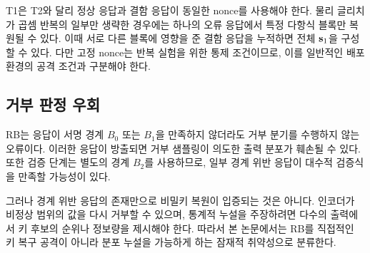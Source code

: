 T1은 T2와 달리 정상 응답과 결함 응답이 동일한 nonce를 사용해야 한다.
물리 글리치가 곱셈 반복의 일부만 생략한 경우에는 하나의 오류 응답에서
특정 다항식 블록만 복원될 수 있다. 이때 서로 다른 블록에 영향을 준
결함 응답을 누적하면 전체 $\mathbf{s}_1$을 구성할 수 있다. 다만 고정
nonce는 반복 실험을 위한 통제 조건이므로, 이를 일반적인 배포 환경의
공격 조건과 구분해야 한다.

\subsection{거부 판정 우회}

RB는 응답이 서명 경계 $B_0$ 또는 $B_1$을 만족하지 않더라도 거부
분기를 수행하지 않는 오류이다. 이러한 응답이 방출되면 거부 샘플링이
의도한 출력 분포가 훼손될 수 있다. 또한 검증 단계는 별도의 경계
$B_2$를 사용하므로, 일부 경계 위반 응답이 대수적 검증식을 만족할
가능성이 있다.

그러나 경계 위반 응답의 존재만으로 비밀키 복원이 입증되는 것은 아니다.
인코더가 비정상 범위의 값을 다시 거부할 수 있으며, 통계적 누설을
주장하려면 다수의 출력에서 키 후보의 순위나 정보량을 제시해야 한다.
따라서 본 논문에서는 RB를 직접적인 키 복구 공격이 아니라 분포 누설을
가능하게 하는 잠재적 취약성으로 분류한다.
